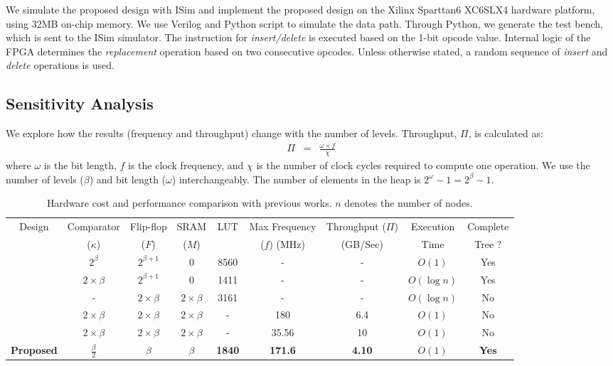 We simulate the proposed design with ISim and implement the proposed design on the Xilinx Sparttan6 XC6SLX4 hardware platform, using 32MB on-chip memory.
We use Verilog and Python script to simulate the data path.
Through Python, we generate the test bench, which is sent to the ISim simulator.
The instruction for {\it insert/delete} is executed based on the 1-bit opcode value.
Internal logic of the FPGA determines the {\it replacement} operation based on two consecutive opcodes.
Unless otherwise stated, a random sequence of {\it insert} and {\it delete} operations is used.

\subsection{Sensitivity Analysis}
We explore how the results (frequency and throughput) change with the number of levels.
Throughput, $\Pi$, is calculated as:
\begin{eqnarray}
\Pi &=&  \frac{\omega \times  f}{\chi}
\end{eqnarray}
 where $\omega$ is the bit length, $f$ is the clock frequency, and $\chi$ is the number of clock cycles required to compute one operation.
We use the number of levels ($\beta$) and bit length ($\omega$) interchangeably.
The number of elements in the heap is $2^\omega-1 = 2^\beta -1$.

\begin{table}
 \begin{center}
 \caption{Hardware cost and performance comparison with previous works. $n$ denotes the number of nodes.}
\label{table4}
\begin{tabular}{ |c|c|c|c|c|c|c|c|c| }
 \hline
 Design  & Comparator  & Flip-flop & SRAM & LUT &Max Frequency & Throughput ($\Pi$) & Execution & Complete \\
  & ($\kappa$)& ($F$)& ($M$) &  & ($f$) (MHz) & (GB/Sec) & Time & Tree ?\\
 \hline
 \hline
 \cite{hw8} & $2^\beta$ & $2^{\beta +1}$& 0 & 8560 & - & - & $O(1)$ & Yes\\
 \hline
 \cite{fpga2} & $2 \times \beta$ & $2^{\beta +1}$ & 0 & 1411 & - & - & $O(\log n)$ & Yes\\
 \hline
 \cite{hwsw1} & - & $2 \times \beta$ & $2 \times \beta$ & 3161 & - & - & $O(\log n)$ & No\\
 \hline
 \cite{fpga1} & $2 \times \beta$ & $2 \times \beta$ & $2 \times \beta$ & - & 180 &6.4 & $O(1)$ & No\\
 \hline
 \cite{hw2} & $2 \times \beta$ & $2 \times \beta$ & $2 \times \beta$ & - & 35.56 &10 & $O(1)$ & No\\
 \hline 
{\bf Proposed} & {\bf $\frac{\beta}{2}$} & {\bf $\beta$} & {\bf $\beta$} & {\bf 1840} & {\bf 171.6} & {\bf 4.10} & {\bf $O(1)$} & {\bf Yes}\\
 \hline
\end{tabular}
\end{center}
\end{table}

